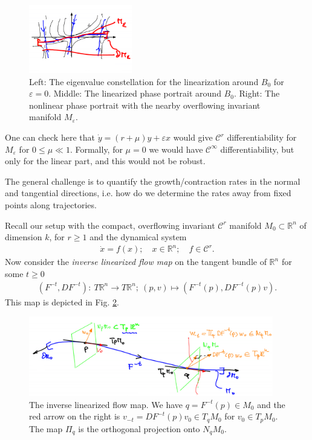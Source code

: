 \begin{ex}[]
\begin{figure}[h!]
		\includegraphics[width=0.4\textwidth]{figures/ch9/12alpha_specification_3.png}
		\caption{Left: The eigenvalue constellation for the linearization around $B_0$ for $\varepsilon=0$. Middle: The linearized phase portrait around $B_0$. Right: The nonlinear phase portrait with the nearby overflowing invariant manifold $M_{\varepsilon}$.}
		\label{fig:alpha_specification}
	\end{figure}

	One can check here that $\dot{y}= (r+\mu )y + \varepsilon x$ would give $\mathcal{C}^{r}$ differentiability for $M_{\varepsilon}$ for $0 \leq \mu \ll 1$. Formally, for $\mu=0 $ we would have $\mathcal{C}^{\infty }$ differentiability, but only for the linear part, and this would not be robust.	
\end{ex}

The general challenge is to quantify the growth/contraction rates in the normal and tangential directions, i.e. how do we determine the rates away from fixed points along trajectories.

Recall our setup with the compact, overflowing invariant $\mathcal{C}^{r}$ manifold $M_0 \subset   \mathbb{R}^{n}$ of dimension $k$, for $r\geq 1$ and the dynamical system 
\begin{align}
	\dot{x} = f(x);\quad x \in \mathbb{R}^{n};\quad f\in \mathcal{C}^{r}.
\end{align}
Now consider the \emph{inverse linearized flow map} on the tangent bundle of $\mathbb{R}^{n}$ for some $t\geq 0$
\begin{align}
	(F^{-t}, DF^{-t}):\ T\mathbb{R}^{n} \to T\mathbb{R}^{n};\ (p,v) \mapsto \left(F^{-t}(p), DF^{-t}(p)v\right).
\end{align}
This map is depicted in Fig. \ref{fig:inv_lin_flow_map}.
\begin{figure}[h!]
	\centering
	\includegraphics[width=0.95\textwidth]{figures/ch9/13inv_lin_flow_map.png}
	\caption{The inverse linearized flow map. We have $q=F^{-t}(p)\in M_0$ and the red arrow on the right is $v_{-t}=DF^{-t}(p)v_0 \in T_{q}M_0$ for $v_0 \in T_{p}M_0$. The map $\Pi_{q}$ is the orthogonal projection onto $N_{q}M_0$.}
	\label{fig:inv_lin_flow_map}
\end{figure}

